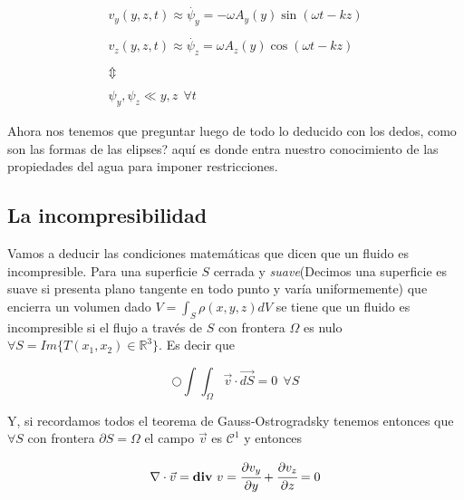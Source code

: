 \documentclass[a4paper,spanish]{article}
\newcommand{\oiint}{\displaystyle\bigcirc\!\!\!\!\!\!\!\!\int\!\!\!\!\!\int}
\def\R {\mathbb{R}}
\numberwithin{equation}{section}
\begin{document}
\begin{equation}
\begin{array}{c}
v_y(y,z,t)\approx \dot{\psi_y}=-\omega A_y(y)\sin{(\omega t -kz)} \\
\\
v_z(y,z,t)\approx \dot{\psi_z}=\omega A_z(y)\cos{(\omega t -kz)} \\
\\
\Updownarrow \\
\\
\psi_y,\psi_z \ll y,z \ \ \forall t 
\end{array}
\label{velocidad_fluido}
\end{equation}

Ahora nos tenemos que preguntar luego de todo lo deducido con los dedos, como son las formas de las elipses? aqu\'i es donde entra nuestro conocimiento de las propiedades del agua para imponer restricciones.

\subsection{La incompresibilidad}
Vamos a deducir las condiciones matem\'aticas que dicen que un fluido es incompresible. Para una superficie $S$ cerrada y \textit{suave}(Decimos una superficie es suave si presenta plano tangente en todo punto y var\'ia uniformemente) que encierra un volumen dado $V= \int_S \rho(x,y,z)dV$ se tiene que un fluido es incompresible si el flujo a trav\'es de $S$ con frontera $\Omega$ es nulo $\forall S=Im\lbrace{T(x_1,x_2) \in \R^3}\rbrace$. Es decir que

\[ \oiint_{\Omega} {\vec{v} \cdot \vec{dS}} =0 \ \ \forall S \]

Y, si recordamos todos el  teorema de Gauss-Ostrogradsky tenemos entonces que $\forall S$ con frontera $\partial S=\Omega$ el campo $\vec{v}$ es $\mathcal{C}^1$ y entonces

\begin{equation}
\nabla \cdot \vec{v}= \textbf{div} \ v = \cfrac{\partial v_y}{\partial y} + \cfrac{\partial v_z}{\partial z} = 0
\label{condiciones_incompresibilidad}
\end{equation}
\end{document}
